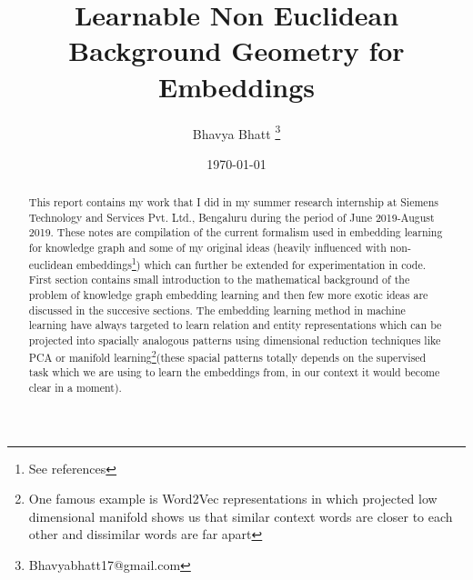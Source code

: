 \documentclass[12pt]{article}
\title{Learnable Non Euclidean Background Geometry for Embeddings}
\author[1]{Bhavya Bhatt \thanks{Bhavyabhatt17@gmail.com}}
\affil[1]{Indian Institute of Technology Mandi, Mandi 175005, India}
\date{\today}
\begin{document}
\maketitle

\begin{abstract}
This report contains my work that I did in my summer research internship at Siemens Technology and Services Pvt. Ltd., Bengaluru during the period of June 2019-August 2019. These notes are compilation of the current formalism used in embedding learning for knowledge graph and some of my original ideas (heavily influenced with non-euclidean embeddings\footnote{See references}) which can further be extended for experimentation in code. First section contains small introduction to the mathematical background of the problem of knowledge graph embedding learning and then few more exotic ideas are discussed in the succesive sections. The embedding learning method in machine learning have always targeted to learn relation and entity representations which can be projected into spacially analogous patterns using dimensional reduction techniques like PCA or manifold learning\footnote{One famous example is Word2Vec representations in which projected low dimensional manifold shows us that similar context words are closer to each other and dissimilar words are far apart}(these spacial patterns totally depends on the supervised task which we are using to learn the embeddings from, in our context it would become clear in a moment).
\end{abstract}

\newpage

\tableofcontents
\newpage
\end{document}
